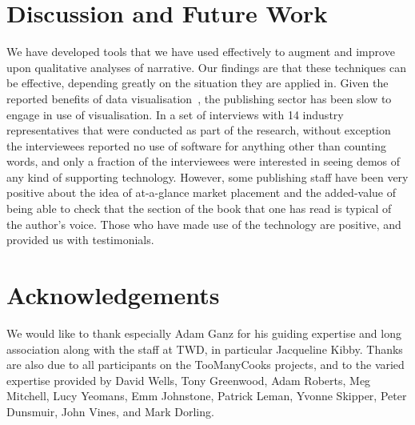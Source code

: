 \documentclass{article}
\begin{document}
\section{Discussion and Future Work} 
\label{conclusions}
We have developed tools that we have used effectively to augment and improve upon qualitative analyses of narrative. Our  findings are that these techniques can be effective, depending greatly on the situation they are applied in.  Given the reported benefits of data visualisation~\cite{tufte1983visual,spiegelhalter2011visualizing}, the publishing sector has been slow to engage in use of visualisation.  In a set of interviews with 14 industry representatives that were conducted as part of the research, without exception the interviewees reported no use of software for anything other than counting words, and only a fraction of the interviewees were interested in seeing demos of any kind of supporting technology.   However, some publishing staff have been very positive about the idea of at-a-glance market placement and the added-value of being able to check that the section of the book that one has read is typical of the author's voice. Those who have made use of the technology are positive, and provided us with 
testimonials.  













\section{Acknowledgements}
We would like to thank especially Adam Ganz for his guiding expertise and long association along with  the staff at TWD, in particular Jacqueline Kibby. Thanks are also due to all participants on the TooManyCooks projects, and to the varied expertise provided by David Wells, Tony Greenwood, Adam Roberts, Meg Mitchell, Lucy Yeomans, Emm Johnstone, Patrick Leman, Yvonne Skipper, Peter Dunsmuir, John Vines, and Mark Dorling.


\end{document}
